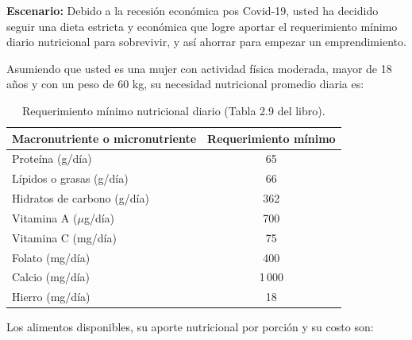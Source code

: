 \documentclass[12pt]{article}
\begin{document}
\textbf{Escenario:} Debido a la recesi\'on econ\'omica pos Covid-19, usted ha decidido seguir una dieta estricta y econ\'omica que logre aportar el requerimiento m\'inimo diario nutricional para sobrevivir, y as\'i ahorrar para empezar un emprendimiento.

Asumiendo que usted es una mujer con actividad f\'isica moderada, mayor de 18 a\~nos y con un peso de 60 kg, su necesidad nutricional promedio diaria es:

\begin{table}[h]
\centering
\begin{tabular}{lc}
\toprule
\textbf{Macronutriente o micronutriente} & \textbf{Requerimiento m\'inimo} \\
\midrule
Prote\'ina (g/d\'ia)           & 65    \\
L\'ipidos o grasas (g/d\'ia)   & 66    \\
Hidratos de carbono (g/d\'ia)  & 362   \\
Vitamina A ($\mu$g/d\'ia)      & 700   \\
Vitamina C (mg/d\'ia)          & 75    \\
Folato (mg/d\'ia)              & 400   \\
Calcio (mg/d\'ia)              & 1\,000 \\
Hierro (mg/d\'ia)              & 18    \\
\bottomrule
\end{tabular}
\caption{Requerimiento m\'inimo nutricional diario (Tabla 2.9 del libro).}
\end{table}

Los alimentos disponibles, su aporte nutricional por porci\'on y su costo son:
\end{document}

